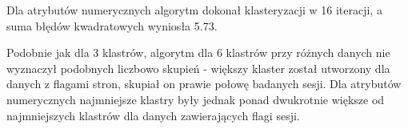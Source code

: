 \documentclass{classrep}
\begin{document}
    Dla atrybutów numerycznych algorytm dokonał klasteryzacji w 16 iteracji, a suma błędów kwadratowych wyniosła 5.73.
    
    \begin{table}[H]
    \centering
    \caption{Wybrane centroidy dla 6 klastrów z flagami numerycznymi podczas analizy sesji}
    \end{table}
    
    \begin{table}[H]
    \centering
    \caption{Przypisanie obserwacji dla 6 klastrów z atrybutami numerycznymi podczas analizy sesji}
    \label{tab:num_6clusters_pages_sum}
    \end{table}
    
    Podobnie jak dla 3 klastrów, algorytm dla 6 klastrów przy różnych danych nie wyznaczył podobnych liczbowo skupień - większy klaster został utworzony dla danych z flagami stron, skupiał on prawie połowę badanych sesji. Dla atrybutów numerycznych najmniejsze klastry były jednak ponad dwukrotnie większe od najmniejszych klastrów dla danych zawierających flagi sesji.
    
\end{document}
